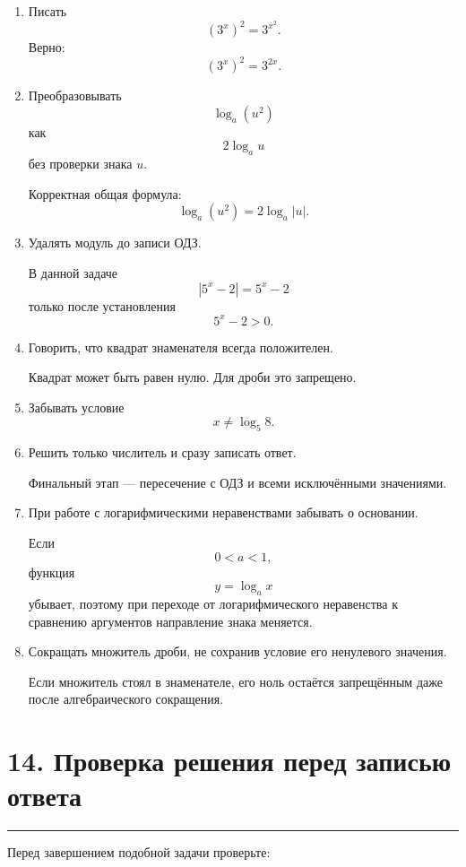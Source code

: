 \documentclass[a4paper,12pt]{article}
\newcommand{\topicline}{%
  \par\noindent
  {\color{accent!55}\rule{\linewidth}{0.6pt}}
  \par
}
\begin{document}
\begin{enumerate}
\item
Писать
\[
(3^x)^2=3^{x^2}.
\]
Верно:
\[
(3^x)^2=3^{2x}.
\]

\item
Преобразовывать
\[
\log_a(u^2)
\]
как
\[
2\log_a u
\]
без проверки знака \(u\).

Корректная общая формула:
\[
\log_a(u^2)=2\log_a|u|.
\]

\item
Удалять модуль до записи ОДЗ.

В данной задаче
\[
|5^x-2|=5^x-2
\]
только после установления
\[
5^x-2>0.
\]

\item
Говорить, что квадрат знаменателя всегда положителен.

Квадрат может быть равен нулю. Для дроби это запрещено.

\item
Забывать условие
\[
x\ne\log_5 8.
\]

\item
Решить только числитель и сразу записать ответ.

Финальный этап --- пересечение с ОДЗ и всеми исключёнными значениями.

\item
При работе с логарифмическими неравенствами забывать о основании.

Если
\[
0<a<1,
\]
функция
\[
y=\log_a x
\]
убывает, поэтому при переходе от логарифмического неравенства к сравнению аргументов направление знака меняется.

\item
Сокращать множитель дроби, не сохранив условие его ненулевого значения.

Если множитель стоял в знаменателе, его ноль остаётся запрещённым даже после алгебраического сокращения.
\end{enumerate}




\section*{\color{darkaccent}14. Проверка решения перед записью ответа}
\topicline

Перед завершением подобной задачи проверьте:
\end{document}

